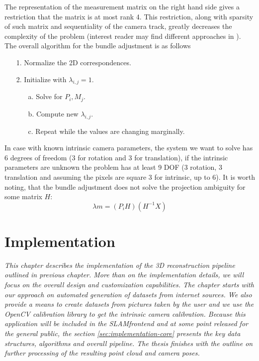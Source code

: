 The representation of the measurement matrix on the right hand side gives a restriction that the matrix is at most rank 4. This restriction, along with sparsity of such matrix and sequentiality of the camera track, greatly decreases the complexity of the problem (interest reader may find different approaches in \cite{cvfx, book:multiple_view_geometry}). The overall algorithm for the bundle adjustment is as follows
\begin{itemize}
	\item[1.] Normalize the 2D correspondences.
	\item[2.] Initialize with $\lambda_{i,j} = 1$.
	\begin{itemize}
		\item[a.] Solve for $P_i, M_j$.
		\item[b.] Compute new $\lambda_{i,j}$.
		\item[c.] Repeat while the values are changing marginally.
	\end{itemize}
\end{itemize}

In case with known intrinsic camera parameters, the system we want to solve has 6 degrees of freedom (3 for rotation and 3 for translation), if the intrinsic parameters are unknown the problem has at least 9 DOF (3 rotation, 3 translation and assuming the pixels are square 3 for intrinsic, up to 6). It is worth noting, that the bundle adjustment does not solve the projection ambiguity for some matrix $H$:
\begin{equation}
	\lambda m = (P_i H) (H^{-1} X)
\end{equation}

\chapter{Implementation}
\label{chapter:implementation}
\textit{This chapter describes the implementation of the 3D reconstruction pipeline outlined in previous chapter. More than on the implementation details, we will focus on the overall design and customization capabilities. The chapter starts with our approach on automated generation of datasets from internet sources. We also provide a means to create datasets from pictures taken by the user and we use the OpenCV calibration library to get the intrinsic camera calibration. Because this application will be included in the SLAM\textunderscore frontend and at some point released for the general public, the section \ref{sec:implementation-core} presents the key data structures, algorithms and overall pipeline. The thesis finishes with the outline on further processing of the resulting point cloud and camera poses.}

